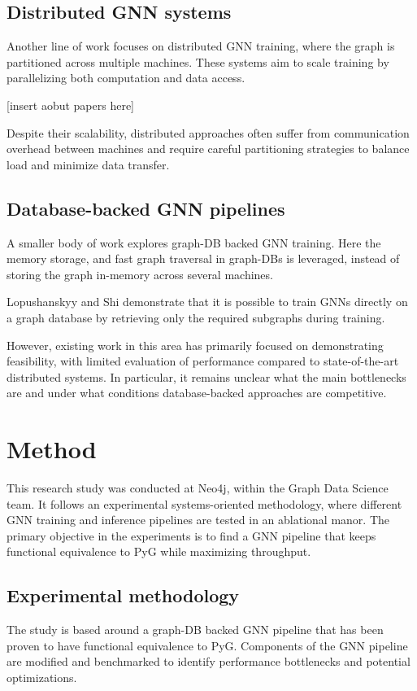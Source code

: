 \documentclass[ oneside,openright,titlepage,numbers=noenddot,headinclude,%
                footinclude=true,cleardoublepage=empty,abstractoff, %
                BCOR=0mm,paper=a4,fontsize=11pt,%
                ngerman,american,%
                ]{scrreprt}
\begin{document}
\section{Distributed GNN systems}
Another line of work focuses on distributed GNN training, where the graph is partitioned across multiple machines. These systems aim to scale training by parallelizing both computation and data access.

[insert aobut papers here]

Despite their scalability, distributed approaches often suffer from communication overhead between machines and require careful partitioning strategies to balance load and minimize data transfer.


\section{Database-backed GNN pipelines}

A smaller body of work explores graph-DB backed GNN training. Here the memory storage, and fast graph traversal in graph-DBs is leveraged, instead of storing the graph in-memory across several machines.


Lopushanskyy and Shi demonstrate that it is possible to train GNNs directly on a graph database by retrieving only the required subgraphs during training. 


However, existing work in this area has primarily focused on demonstrating feasibility, with limited evaluation of performance compared to state-of-the-art distributed systems. 
In particular, it remains unclear what the main bottlenecks are and under what conditions database-backed approaches are competitive.


\chapter{Method}

This research study was conducted at Neo4j, within the Graph Data Science team. It follows an experimental systems-oriented methodology, where different GNN training and inference pipelines are tested in an ablational manor. The primary objective in the experiments is to find a GNN pipeline that keeps functional equivalence to PyG while maximizing throughput.

\section{Experimental methodology}
The study is based around a graph-DB backed GNN pipeline that has been proven to have functional equivalence to PyG. Components of the GNN pipeline are modified and benchmarked to identify performance bottlenecks and potential optimizations.
\end{document}
